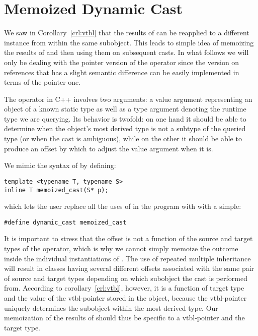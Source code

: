 \section{Memoized Dynamic Cast}
\label{sec:memcast}

We saw in Corollary~\ref{crl:vtbl} that the results of  can 
be reapplied to a different instance from within the same subobject. This leads 
to simple idea of memoizing the results of  and then using 
them on subsequent casts. In what follows we will only be dealing with the  
pointer version of the operator since the version on references that has a 
slight semantic difference can be easily implemented in terms of the pointer one.

The  operator in C++ involves two arguments: a value argument 
representing an object of a known static type as well as a type argument 
denoting the runtime type we are querying. Its behavior is twofold: on one hand 
it should be able to determine when the object's most derived type is not a 
subtype of the queried type (or when the cast is ambiguous), while on the other 
it should be able to produce an offset by which to adjust the value argument when it is.

We mimic the syntax of  by defining:

\begin{lstlisting}
template <typename T, typename S>
inline T memoized_cast(S* p);
\end{lstlisting}

\noindent
which lets the user replace all the uses of  in the program 
with  with a simple:

\begin{lstlisting}
#define dynamic_cast memoized_cast
\end{lstlisting}

\noindent
It is important to stress that the offset is not a function of the source and target 
types of the  operator, which is why we cannot simply memoize the 
outcome inside the individual instantiations of .
The use of repeated multiple inheritance will result in classes having several 
different offsets associated with the same pair of source and target types 
depending on which subobject the cast is performed from. According to 
corollary~\ref{crl:vtbl}, however, it is a function of target type and the value 
of the vtbl-pointer stored in the object, because the vtbl-pointer uniquely 
determines the subobject within the most derived type. Our memoization of the 
results of  should thus be specific to a vtbl-pointer and the 
target type. 

